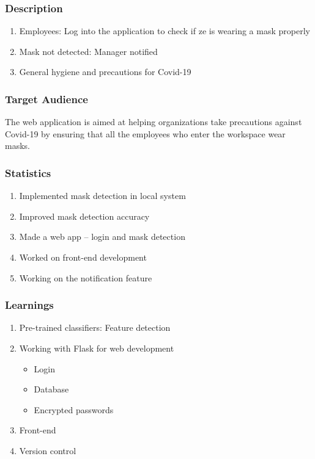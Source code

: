 \documentclass[14pt]{beamer}
\begin{document}
\begin{frame}
    \frametitle{Description}
    \begin{enumerate}

        \item Employees: Log into the application to check if ze is wearing a mask properly

        \item Mask not detected: Manager notified

        \item General hygiene and precautions for Covid-19
    \end{enumerate}
\end{frame}


\begin{frame}
    \frametitle{Target Audience}
    The web application is  aimed at helping organizations take precautions against Covid-19 by ensuring that all the employees who enter the workspace wear masks.
\end{frame}

\begin{frame}
    \frametitle{Statistics}
    \begin{enumerate}
        \item Implemented mask detection in local system
        \item Improved mask detection accuracy
        \item Made a web app -- login and mask detection
        \item Worked on front-end development
        \item Working on the notification feature
    \end{enumerate}
\end{frame}

\begin{frame}
    \frametitle{Learnings}
    \begin{enumerate}
        \item Pre-trained classifiers: Feature detection
        \item Working with Flask for web development
        \begin{itemize}
            \item Login 
            \item Database
            \item Encrypted passwords
        \end{itemize}
        \item Front-end
        \item Version control
    \end{enumerate}
\end{frame}
\end{document}
